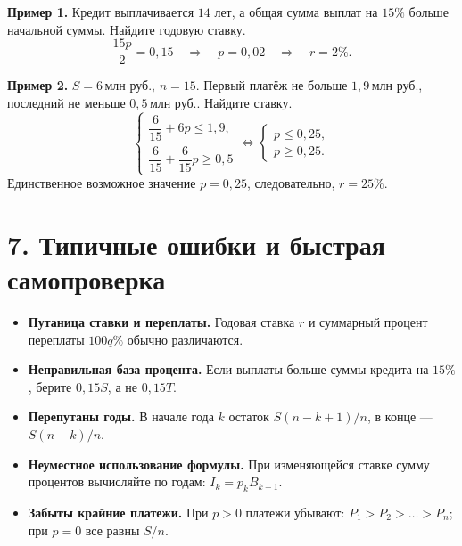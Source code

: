 \documentclass[a4paper,12pt]{article}
\newcommand{\key}[1]{\textcolor{darkaccent}{\textbf{#1}}}
\newcommand{\mln}{\,\text{млн руб.}}
\begin{document}
\textbf{Пример 1.} Кредит выплачивается $14$ лет, а общая сумма выплат на $15\%$ больше начальной суммы. Найдите годовую ставку.
\[
\frac{15p}{2}=0{,}15\quad\Longrightarrow\quad
p=0{,}02\quad\Longrightarrow\quad r=2\%.
\]

\textbf{Пример 2.} $S=6\mln$, $n=15$. Первый платёж не больше $1{,}9\mln$, последний не меньше $0{,}5\mln$. Найдите ставку.
\[
\begin{cases}
\dfrac6{15}+6p\le1{,}9,\\[3pt]
\dfrac6{15}+\dfrac6{15}p\ge0{,}5
\end{cases}
\iff
\begin{cases}p\le0{,}25,\\p\ge0{,}25.
\end{cases}
\]
Единственное возможное значение $p=0{,}25$, следовательно, $r=25\%$.

\section*{7. Типичные ошибки и быстрая самопроверка}

\begin{itemize}
\item \key{Путаница ставки и переплаты.} Годовая ставка $r$ и суммарный процент переплаты $100q\%$ обычно различаются.
\item \key{Неправильная база процента.} Если выплаты больше суммы кредита на $15\%$, берите $0{,}15S$, а не $0{,}15T$.
\item \key{Перепутаны годы.} В начале года $k$ остаток $S(n-k+1)/n$, в конце --- $S(n-k)/n$.
\item \key{Неуместное использование формулы.} При изменяющейся ставке сумму процентов вычисляйте по годам: $I_k=p_k B_{k-1}$.
\item \key{Забыты крайние платежи.} При $p>0$ платежи убывают: $P_1>P_2>\dots>P_n$; при $p=0$ все равны $S/n$.
\end{itemize}

\clearpage
\end{document}
